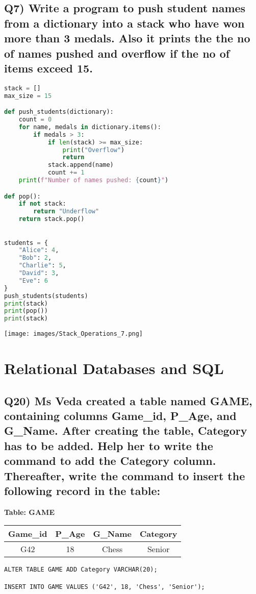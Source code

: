 \documentclass{article}
\begin{document}
\subsection*{Q7) Write a program to push student names from a dictionary into a stack who have won more than 3 medals. Also it prints the the no of names pushed and overflow if the no of items exceed 15.}
\begin{lstlisting}[language=Python]
stack = []
max_size = 15

def push_students(dictionary):
    count = 0
    for name, medals in dictionary.items():
        if medals > 3:
            if len(stack) >= max_size:
                print("Overflow")
                return
            stack.append(name)
            count += 1
    print(f"Number of names pushed: {count}")

def pop():
    if not stack:
        return "Underflow"
    return stack.pop()

 
students = {
    "Alice": 4,
    "Bob": 2,
    "Charlie": 5,
    "David": 3,
    "Eve": 6
}
push_students(students)
print(stack)
print(pop())
print(stack)
\end{lstlisting}
\texttt{[image: images/Stack\_Operations\_7.png]}

\section{Relational Databases and SQL}

\subsection*{Q20) Ms Veda created a table named GAME, containing columns Game\_id, P\_Age, and G\_Name. After creating the table, Category has to be added. Help her to write the command to add the Category column. Thereafter, write the command to insert the following record in the table:}

\textbf{Table: GAME}
\begin{center}
\begin{tabular}{|c|c|c|c|}
\hline
Game\_id & P\_Age & G\_Name & Category \\
\hline
G42 & 18 & Chess & Senior \\
\hline
\end{tabular}
\end{center}

\begin{lstlisting}
ALTER TABLE GAME ADD Category VARCHAR(20);

INSERT INTO GAME VALUES ('G42', 18, 'Chess', 'Senior');
\end{lstlisting}
\end{document}
